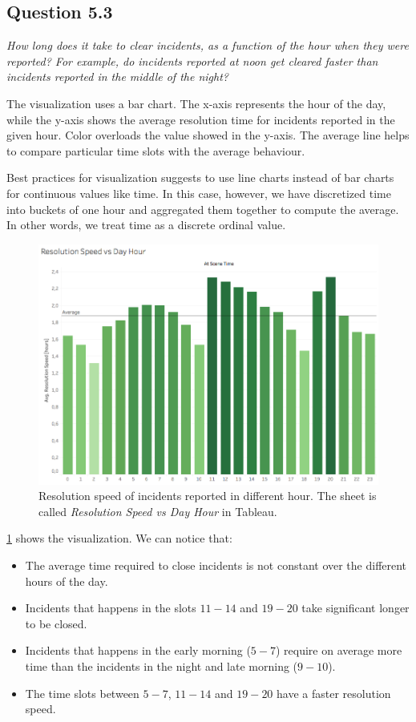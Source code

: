 \subsection*{Question 5.3}
\textit{How long does it take to clear incidents, as a function of the hour when they were reported? For example, do incidents reported at noon get cleared faster than incidents reported in the middle of the night?}

The visualization uses a bar chart.
The x-axis represents the hour of the day, while the y-axis shows the average resolution time for incidents reported in the given hour.
Color overloads the value showed in the y-axis.
The average line helps to compare particular time slots with the average behaviour.

Best practices for visualization suggests to use line charts instead of bar charts for continuous values like time.
In this case, however, we have discretized time into buckets of one hour and aggregated them together to compute the average.
In other words, we treat time as a discrete ordinal value.

\begin{figure}[H]
	\centering
	\includegraphics[width=0.9\columnwidth]{figures/5_3_resolution_speed_vs_hour}
	\caption{Resolution speed of incidents reported in different hour. The sheet is called \textit{Resolution Speed vs Day Hour} in Tableau.}
	\label{fig:5_3_resolution_speed_vs_hour}
\end{figure}

\cref{fig:5_3_resolution_speed_vs_hour} shows the visualization.
We can notice that:
\begin{itemize}
    \item The average time required to close incidents is not constant over the different hours of the day.
    \item Incidents that happens in the slots $11 - 14$ and $19 - 20$ take significant longer to be closed.
    \item Incidents that happens in the early morning ($5 - 7$) require on average more time than the incidents in the night and late morning ($9 - 10$).
    \item The time slots between $5 - 7$, $11 - 14$ and $19 - 20$ have a faster resolution speed.
\end{itemize}

